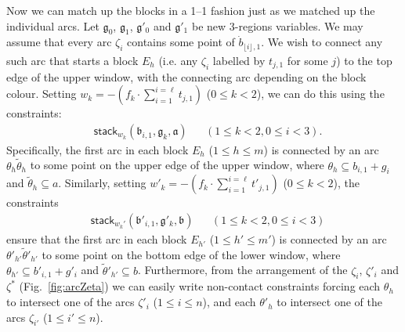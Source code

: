 \documentclass{article}
\newcommand{\tseq}[1]{\mathfrak{#1}}
\newcommand{\intermediate}[1]{\dot{#1}}
\newcommand{\stack}{\mathsf{stack}}
\newcommand{\md}[2][] {{\lfloor#2\rfloor_{#1}}}
\begin{document}
Now we can match up the blocks in a 1--1
fashion just as we matched up the individual arcs. Let $\tseq{g}_0$,
$\tseq{g}_1$, $\tseq{g}'_0$ and $\tseq{g}'_1$ be new 3-regions
variables.  We may assume that every arc $\zeta_i$ contains some point
of $\intermediate{b}_{\md{i},1}$. We wish to connect any such arc that
starts a block $E_h$ (i.e. any $\zeta_i$ labelled by $t_{j,1}$ for
some $j$) to the top edge of the upper window, with the connecting arc
depending on the block colour.  Setting $w_k = -(f_k \cdot \sum_{i =
  1}^{i=\ell} t_{j,1})$ ($0 \leq k < 2$), we can do this using the
constraints:
\begin{align*}
& \stack_{w_k}(\tseq{b}_{i,1}, \tseq{g}_k, \tseq{a}) & & (1 \leq k < 2, 
0 \leq i < 3).
\end{align*}
Specifically, the first arc in each block $E_h$ ($1 \leq h \leq m$) is
connected by an arc $\theta_h\tilde{\theta}_h$ to some point on the
upper edge of the upper window, where $\theta_h \subseteq b_{i,1} + g_i$
and $\tilde{\theta}_h \subseteq a$.  Similarly, setting
$w'_k = -(f_k \cdot \sum_{i = 1}^{i=\ell} t'_{j,1})$ ($0 \leq k < 2$), 
the constraints
\begin{align*}
& \stack_{w_k'}(\tseq{b}'_{i,1}, \tseq{g}'_k, \tseq{b}) & & (1 \leq k < 2, 
0 \leq i < 3)
\end{align*}
ensure that the first arc in each block $E_{h'}$ ($1 \leq h' \leq
m'$) is connected by an arc $\theta'_{h'}\tilde{\theta}'_{h'}$ to some
point on the bottom edge of the lower window, where $\theta_{h'}
\subseteq b'_{i,1} + g'_i$ and $\tilde{\theta}'_{h'} \subseteq b$.
Furthermore, from the arrangement of the $\zeta_i$,
$\zeta'_i$ and $\zeta^*$ (Fig.~\ref{fig:arcZeta}) we can easily write
non-contact constraints
forcing each $\theta_h$ to intersect one of the arcs $\zeta'_i$ ($1
\leq i \leq n$), and each $\theta'_h$ to intersect one of the arcs
$\zeta_{i'}$ ($1 \leq i' \leq n$).
\end{document}

